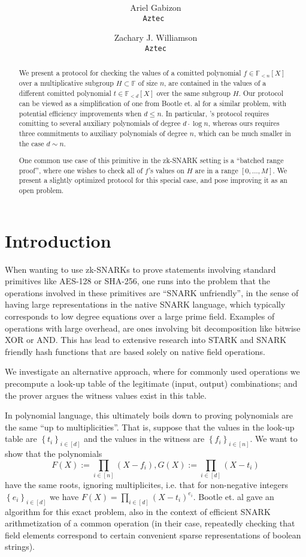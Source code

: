 \documentclass[11pt]{article} %
\title{ \bf \papertitle \\[0.72cm]}
\author{ Ariel Gabizon\\ \tt{Aztec}  \and Zachary J. Williamson\\ \tt{Aztec}}
\newcommand{\F}{\ensuremath{\mathbb F}\xspace}
\newcommand{\defeq}{:=}
\newcommand{\sett}[2]{\ensuremath{\set{#1}_{#2}}\xspace}
\newcommand{\set}[1]{\ensuremath{\left\{#1\right\}}\xspace}
\newcommand{\polysofdeg}[1]{\ensuremath{\F_{< #1}[X]}\xspace}
\begin{document}
    \maketitle

    
    \begin{abstract}
     We present a protocol for checking the values of a comitted polynomial $f\in \polysofdeg{n}$ over a multiplicative subgroup $H\subset \F$ of size $n$, are contained in the values of a different comitted polynomial $t\in \polysofdeg{d}$ over the same subgroup $H$. Our protocol can be viewed as a simplification of one from Bootle et. al \cite{arya} for a similar problem, with potential efficiency improvements when $d\leq n$. In particular, \cite{arya}'s protocol requires comitting to several auxiliary polynomials of degree $d\cdot \log n$, whereas ours requires three commitments to auxiliary polynomials of degree $n$, which can be much smaller in the case $d\sim n$.
     
     One common use case of this primitive in the zk-SNARK setting is a ``batched range proof'', where one wishes to check all of $f$'s values on $H$ are in a range $[0,\ldots,M]$. We present a slightly optimized protocol for this special case, and pose improving it as an open problem.
    \end{abstract}


\section{Introduction}
When wanting to use zk-SNARKs to prove statements involving standard primitives like AES-128 or SHA-256, one runs into the problem that the operations involved in these primitives are ``SNARK unfriendly'', in the sense of having large representations in the native SNARK language, which typically corresponds to low degree equations over a large prime field.
Examples of operations with large overhead, are ones involving bit decomposition like bitwise XOR or AND. This has lead to extensive research into STARK and SNARK friendly hash functions that are based solely on native field operations.


We investigate an alternative approach, where for commonly used operations we precompute a look-up table of the legitimate (input, output) combinations; and the prover argues the witness values exist in this table.

In polynomial language, this ultimately boils down to proving polynomials are the same ``up to multiplicities''.
That is, suppose that the values in the look-up table are \sett{t_i}{i\in [d]} and the values in the witness are \sett{f_i}{i\in [n]}. We want to show that the polynomials
\[F(X)\defeq \prod_{i\in [n]} (X-f_i), G(X)\defeq \prod_{i\in [d]}(X-t_i)\]
have the same roots, ignoring multiplicites, i.e. that for non-negative integers \sett{e_i}{i\in [d]} we  have
$F(X) = \prod_{i\in [d]} (X-t_i)^{e_i}$.
Bootle et. al \cite{arya} gave an algorithm for this exact problem, also in the context of efficient SNARK arithmetization of a common operation (in their case, repeatedly checking that field elements correspond to certain convenient sparse representations of boolean strings).
\end{document}
